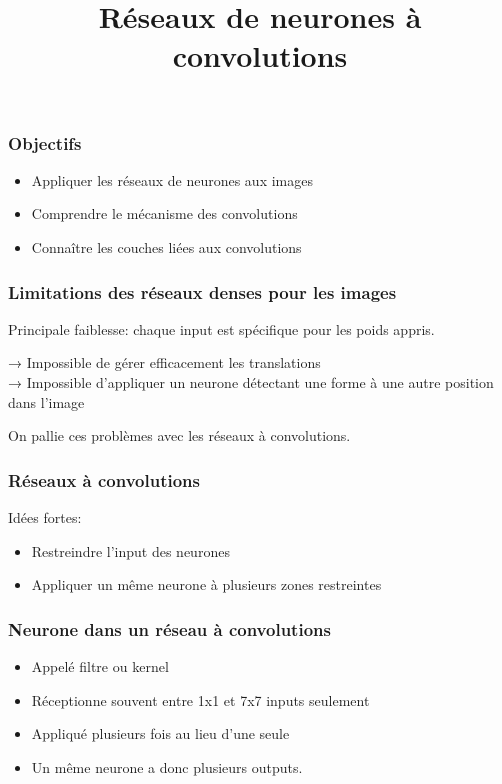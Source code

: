 \documentclass{formation}
\title{Réseaux de neurones à convolutions}
\begin{document}
\maketitle

\begin{frame}
  \frametitle{Objectifs}
  \begin{itemize}
  \item Appliquer les réseaux de neurones aux images
  \item Comprendre le mécanisme des convolutions
  \item Connaître les couches liées aux convolutions
  \end{itemize}
\end{frame}

\begin{frame}
  \frametitle{Limitations des réseaux denses pour les images}
  Principale faiblesse: chaque input est spécifique pour les poids
  appris.

  → Impossible de gérer efficacement les translations\\
  → Impossible
  d'appliquer un neurone détectant une forme à une autre position dans
  l'image

  \alert{On pallie ces problèmes avec les réseaux à convolutions.}
\end{frame}

\begin{frame}
  \frametitle{Réseaux à convolutions}
  Idées fortes:

  \begin{itemize}
  \item Restreindre l'input des neurones
  \item Appliquer un même neurone à plusieurs zones restreintes
  \end{itemize}
\end{frame}

\begin{frame}
  \frametitle{Neurone dans un réseau à convolutions}
  \begin{itemize}
  \item Appelé filtre ou kernel
  \item Réceptionne souvent entre 1x1 et 7x7 inputs seulement
  \item Appliqué plusieurs fois au lieu d'une seule
  \item Un même neurone a donc \alert{plusieurs outputs}.
  \end{itemize}
\end{frame}
\end{document}

